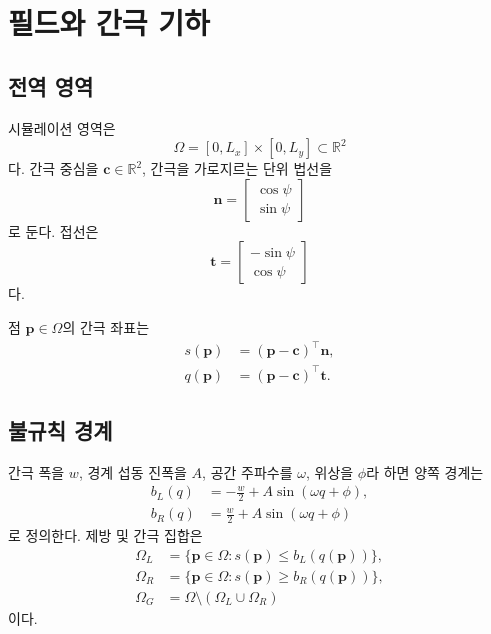 \documentclass[11pt,a4paper]{article}
\newcommand{\R}{\mathbb{R}}
\begin{document}
\section{필드와 간극 기하}

\subsection{전역 영역}

시뮬레이션 영역은
\begin{equation}
  \Omega=[0,L_x]\times[0,L_y]\subset\R^2
\end{equation}
다. 간극 중심을 \(\bm{c}\in\R^2\), 간극을 가로지르는 단위 법선을
\begin{equation}
  \bm{n}=
  \begin{bmatrix}
    \cos\psi\\ \sin\psi
  \end{bmatrix}
\end{equation}
로 둔다. 접선은
\begin{equation}
  \bm{t}=
  \begin{bmatrix}
    -\sin\psi\\ \cos\psi
  \end{bmatrix}
\end{equation}
다.

점 \(\bm{p}\in\Omega\)의 간극 좌표는
\begin{align}
  s(\bm{p}) &= (\bm{p}-\bm{c})^\top\bm{n},\\
  q(\bm{p}) &= (\bm{p}-\bm{c})^\top\bm{t}.
\end{align}

\subsection{불규칙 경계}

간극 폭을 \(w\), 경계 섭동 진폭을 \(A\), 공간 주파수를 \(\omega\), 위상을 \(\phi\)라 하면 양쪽 경계는
\begin{align}
  b_L(q) &= -\frac{w}{2}+A\sin(\omega q+\phi),\\
  b_R(q) &=  \frac{w}{2}+A\sin(\omega q+\phi)
\end{align}
로 정의한다. 제방 및 간극 집합은
\begin{align}
  \Omega_L &= \{\bm{p}\in\Omega:s(\bm{p})\le b_L(q(\bm{p}))\},\\
  \Omega_R &= \{\bm{p}\in\Omega:s(\bm{p})\ge b_R(q(\bm{p}))\},\\
  \Omega_G &= \Omega\setminus(\Omega_L\cup\Omega_R)
\end{align}
이다.
\end{document}
